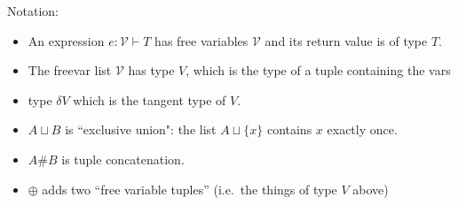 \documentclass[10pt]{article}
\newcommand{\vars}[1]{\mathcal{#1}}
\newcommand{\typed}[3]{#1 : #2 \vdash #3}
\newcommand{\dd}[1]{\delta #1}
\newcommand{\V}{\vars V}
\newcommand{\disjointunion}{\sqcup}
\newcommand{\concat}{\#}
\begin{document}
Notation:

\begin{itemize}
\item
  An expression $\typed{e}{\V}{T}$ has free variables $\V$ and its return value is of type $T$.

\item
  The freevar list $\V$ has type $V$, which is the type of a tuple containing the vars

\item
  type $\dd V$ which is the tangent type of $V$.

\item
  $A \disjointunion B$ is ``exclusive union": the list $A \disjointunion \{x\}$ contains $x$ exactly once.

\item
  $A \concat B$ is tuple concatenation.

\item
  $\oplus$ adds two ``free variable tuples'' (i.e.\ the things of type
  $V$ above)
\end{itemize}

\bigskip
\end{document}

